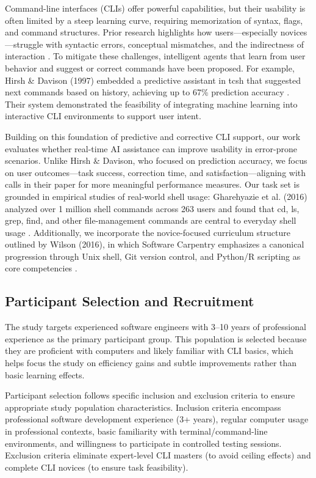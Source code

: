 Command-line interfaces (CLIs) offer powerful capabilities, but their usability is often limited by a steep learning curve, requiring memorization of syntax, flags, and command structures. Prior research highlights how users—especially novices—struggle with syntactic errors, conceptual mismatches, and the indirectness of interaction \cite{margono1987}. To mitigate these challenges, intelligent agents that learn from user behavior and suggest or correct commands have been proposed. For example, Hirsh \& Davison (1997) embedded a predictive assistant in tcsh that suggested next commands based on history, achieving up to 67\% prediction accuracy \cite{hirsh1997}. Their system demonstrated the feasibility of integrating machine learning into interactive CLI environments to support user intent.

Building on this foundation of predictive and corrective CLI support, our work evaluates whether real-time AI assistance can improve usability in error-prone scenarios. Unlike Hirsh \& Davison, who focused on prediction accuracy, we focus on user outcomes—task success, correction time, and satisfaction—aligning with calls in their paper for more meaningful performance measures. Our task set is grounded in empirical studies of real-world shell usage: Gharehyazie et al. (2016) analyzed over 1 million shell commands across 263 users and found that cd, ls, grep, find, and other file-management commands are central to everyday shell usage \cite{gharehyazie2016}. Additionally, we incorporate the novice-focused curriculum structure outlined by Wilson (2016), in which Software Carpentry emphasizes a canonical progression through Unix shell, Git version control, and Python/R scripting as core competencies \cite{wilson2016}.

\subsection{Participant Selection and Recruitment}

The study targets experienced software engineers with 3–10 years of professional experience as the primary participant group. This population is selected because they are proficient with computers and likely familiar with CLI basics, which helps focus the study on efficiency gains and subtle improvements rather than basic learning effects.

Participant selection follows specific inclusion and exclusion criteria to ensure appropriate study population characteristics. Inclusion criteria encompass professional software development experience (3+ years), regular computer usage in professional contexts, basic familiarity with terminal/command-line environments, and willingness to participate in controlled testing sessions. Exclusion criteria eliminate expert-level CLI masters (to avoid ceiling effects) and complete CLI novices (to ensure task feasibility).

